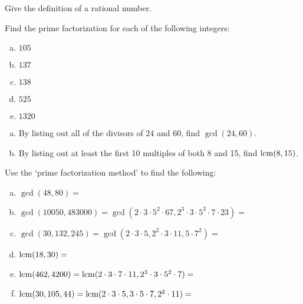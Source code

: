 \documentclass[11pt,letterpaper]{article}
\begin{document}

 Give the definition of a rational number. 



\vfill



 Find the prime factorization for each of the following integers: \pspace
\begin{enumerate}[(a)]
\item $105$ \vfill
\item $137$ \vfill
\item $138$ \vfill
\item $525$ \vfill
\item $1320$ \vfill
\end{enumerate}



\newpage



\begin{enumerate}[(a)]
\item By listing out all of the divisors of $24$ and $60$, find $\gcd(24, 60)$. \vspace{5cm} 

\item By listing out at least the first 10 multiples of both 8 and 15, find $\operatorname{lcm}(8, 15)$. 
\end{enumerate} \vspace{5cm}





 Use the `prime factorization method' to find the following: \pspace
\begin{enumerate}[(a)]
\item $\gcd(48, 80)=$ \vfill
\item $\gcd(10050, 483000)= \gcd(2 \cdot 3 \cdot 5^2 \cdot 67, 2^3 \cdot 3 \cdot 5^3 \cdot 7 \cdot 23)=$ \vfill
\item $\gcd(30, 132, 245)= \gcd(2 \cdot 3 \cdot 5, 2^2 \cdot 3 \cdot 11, 5 \cdot 7^2)=$ \vfill
\item $\operatorname{lcm}(18,30)=$ \vfill
\item $\operatorname{lcm}(462,4200)= \operatorname{lcm}(2 \cdot 3 \cdot 7 \cdot 11, 2^3 \cdot 3 \cdot 5^2 \cdot 7)=$ \vfill
\item $\operatorname{lcm}(30, 105, 44)= \operatorname{lcm}(2 \cdot 3 \cdot 5, 3 \cdot 5 \cdot 7, 2^2 \cdot 11)=$ \vfill
\end{enumerate}
\end{document}
